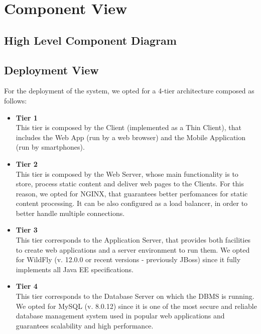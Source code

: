 \documentclass[12pt,a4paper]{article}
\begin{document}
\section{Component View}
	\subsection{High Level Component Diagram}	
	\subsection{Deployment View}
	For the deployment of the system, we opted for a 4-tier architecture composed as follows:
	\begin{itemize}
		\item \textbf{Tier 1}\\
		This tier is composed by the Client (implemented as a Thin Client), that includes the Web App (run by a web browser) and the Mobile Application (run by smartphones). 
		\item \textbf{Tier 2}\\
		This tier is composed by the Web Server, whose main functionality is to store, process static content and deliver web pages to the Clients. For this reason, we opted for NGINX, that guarantees better perfomances for static content processing. It can be also configured as a load balancer, in order to better handle multiple connections.
		\item \textbf{Tier 3}\\
		This tier corresponds to the Application Server, that provides both facilities to create web applications and a server environment to run them. We opted for WildFly (v. 12.0.0 or recent versions - previously JBoss) since it fully implements all Java EE specifications.
		\item \textbf{Tier 4}\\
		This tier corresponds to the Database Server on which the DBMS is running. We opted for MySQL (v. 8.0.12) since it is one of the most secure and reliable database management system used in popular web applications and guarantees scalability and high performance.
	\end{itemize}
\end{document}
